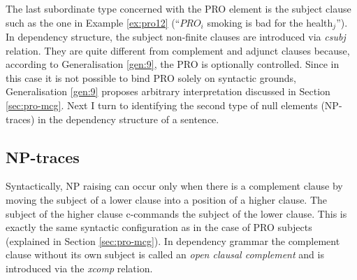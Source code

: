 
    The last subordinate type concerned with the PRO element is the subject clause such as the one in Example \ref{ex:pro12} (``$PRO_i$ smoking is bad for the health$_j$''). In dependency structure, the subject non-finite clauses are introduced via \textit{csubj} relation. They are quite different from complement and adjunct clauses because, according to Generalisation \ref{gen:9}, the PRO is optionally controlled. Since in this case it is not possible to bind PRO solely on syntactic grounds, Generalisation \ref{gen:9} proposes arbitrary interpretation discussed in Section \ref{sec:pro-mcg}. Next I turn to identifying the second type of null elements (NP-traces) in the dependency structure of a sentence.

\subsection{NP-traces}
\label{sec:np-traces}
    Syntactically, NP raising can occur only when there is a complement clause by moving the subject of a lower clause into a position of a higher clause. The subject of the higher clause c-commands the subject of the lower clause. This is exactly the same syntactic configuration as in the case of PRO subjects (explained in Section \ref{sec:pro-mcg}). In dependency grammar the complement clause without its own subject is called an \textit{open clausal complement} and is introduced via the \textit{xcomp} relation.

